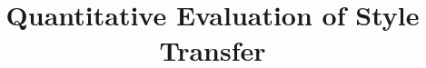 \documentclass[runningheads]{llncs}
\newcommand{\vect}[1]{{\bf {#1}}}
\newcommand{\matx}[1]{{\cal {#1}}}
\begin{document}
\pagestyle{headings}
\mainmatter
\def\ECCV18SubNumber{1861}  %
\def\httilde{\mbox{\tt\raisebox{-.5ex}{\symbol{126}}}}

\newcommand{\sign}[1]{{\mbox{sign}}{{#1}}}
\newcommand{\ea}[0]{{\em et al. }}
\newcommand{\plan}[1] {{\bf Plan:}\\ {\em {#1}}}
\newcommand{\dafkld}[2]{{\mathbb{D}({{{#1}}}\! \mid \! \mid {{{#2}}})}}
\newcommand{\pr}[1]{{\rm Pr}[#1]}
\renewcommand{\refname}{}
\renewcommand{\contentsname}{\vspace*{-1.2cm}}
\newcommand{\newterm}[1]{{\bf #1}}
\newcommand{\capsty}[1]{{\em {#1}}}
\newcommand{\argmax}[1]{{\begin{array}{c}\mbox{argmax}\\{{#1}}\end{array}}}
\newcommand{\todo}[1]{{{\bf TODO:} {{#1}}}}
\newcommand{\covmat}[1]{{
{\small {\mathsf{Covmat}}
 \left( \left\{ 
{{#1}}
      \right\} \right)
}}}
\newcommand{\mean}[1]{{{\mathsf{mean}}\left(
      \left\{{#1}\right\}\right)}}
\title{Quantitative Evaluation of Style Transfer}
\vspace{-3mm}

\end{document}
